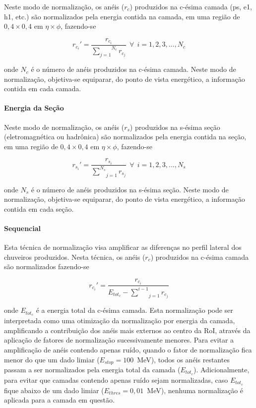Neste modo de normalização, os anéis ($r_c$) produzidos na c-ésima camada
(\gls{ps}, \gls{e1}, \gls{h1}, etc.) 
são normalizados pela energia contida na camada, em uma região de $0,4 \times 0,4$ em $\eta 
\times \phi$, fazendo-se

\begin{equation}
r_{c_{i}}' = \frac{r_{c_{i}}}{\overset{N_c}{\underset{j=1}{\sum}} r_{c_j}}~~\forall~~i=1,2,3,...,N_c
\end{equation}

\noindent onde $N_c$ é o número de anéis produzidos na c-ésima camada. Neste modo de normalização, 
objetiva-se equiparar, do ponto de vista energético, a informação contida em cada camada.


\paragraph{Energia da Seção}
\label{par:norm_secao}

Neste modo de normalização, os anéis ($r_s$) produzidos na s-ésima seção (eletromagnética 
ou hadrônica) são normalizados pela energia contida na seção, em uma região de $0,4 \times 0,4$ 
em $\eta \times \phi$, fazendo-se

\begin{equation}
r_{s_{i}}' = \frac{r_{s_{i}}}{\underset{j=1}{\overset{N_s}{ \sum}} r_{s_{j}}}~~\forall~~i=1,2,3,...,N_s
\end{equation}

\noindent onde $N_s$ é o número de anéis produzidos na s-ésima seção. Neste modo de normalização, 
objetiva-se equiparar, do ponto de vista energético, a informação contida em cada seção.


\paragraph{Sequencial}
\label{par:norm_seq}

Esta técnica de normalização visa amplificar as diferenças no perfil lateral dos chuveiros produzidos. 
Nesta técnica, os anéis ($r_c$) produzidos na c-ésima camada são normalizados fazendo-se

\begin{equation}
\label{eq:normalizacao_sequencial}
r_{c_{i}}' = \frac{r_{c_{i}}}{ E_{tot_{c}} - \underset{j=1}{\overset{i-1}{\sum}} r_{c_{j}} }
\end{equation}

\noindent onde $E_{tot_{c}}$ é a energia total da c-ésima camada. Esta normalização pode ser interpretada 
como uma otimização da normalização por energia da camada, amplificando a contribuição dos anéis mais 
externos ao centro da RoI, através da aplicação de fatores de normalização sucessivamente menores. Para 
evitar a amplificação de anéis contendo apenas ruído, quando o fator de normalização fica menor do que 
um dado limiar  ($E_{stop} = 100$~MeV), todos os anéis restantes passam a ser normalizados pela energia 
total da camada ($E_{tot_{c}}$). Adicionalmente, para evitar que camadas contendo apenas ruído sejam 
normalizadas, caso $E_{tot_{c}}$ fique abaixo de um dado limiar ($E_{thres} = 0,01$~MeV), nenhuma 
normalização é aplicada para a camada em questão.


